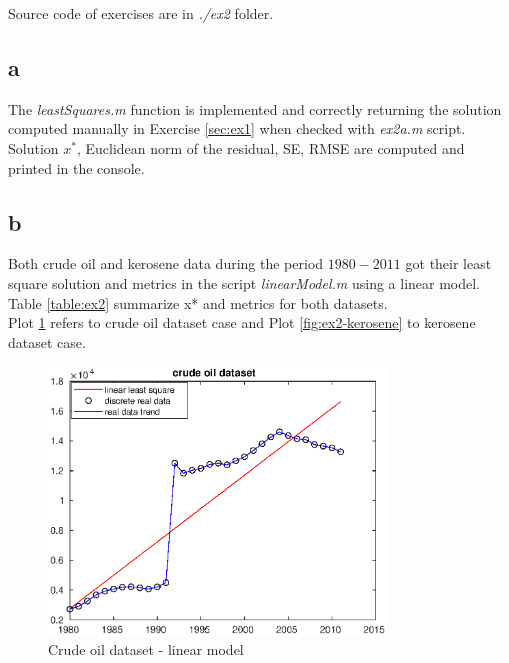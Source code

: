 \documentclass[unicode,11pt,a4paper,oneside,numbers=endperiod,openany]{scrartcl}
\begin{document}
Source code of exercises are in \textit{./ex2} folder.

\subsection*{a}
The \textit{leastSquares.m} function is implemented and correctly returning the solution computed manually in
Exercise \ref{sec:ex1} when checked with \textit{ex2a.m} script.\\
Solution $x^*$, Euclidean norm of the residual, SE, RMSE are computed and printed in the console.

\subsection*{b}
Both crude oil and kerosene data during the period $1980-2011$ got their least square solution and metrics in
the script \textit{linearModel.m} using a linear model. \\
Table \ref{table:ex2} summarize x* and metrics for both datasets. \\
Plot \ref{fig:ex2-oil} refers to crude oil dataset case and Plot \ref{fig:ex2-kerosene} to kerosene dataset case.

\begin{figure}[H]
    \centering
    \caption{Crude oil dataset - linear model}
    \label{fig:ex2-oil}
    \includegraphics[width=0.8\textwidth]{ex2-oil.eps}
\end{figure}
\end{document}
